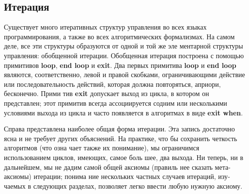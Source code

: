 \subsection{Итерация}
\noindent Существует много итеративных структур управления во всех языках 
программирования, а также во всех алгоритмических формализмах. 
На самом деле, все эти структуры образуются от одной и той же эле­
ментарной структуры управления: обобщенной итерации. Обобщенная 
итерация построена с помощью примитивов \textbf{loop},  \textbf{end loop} и \textbf{exit}. Два 
первых примитива \textbf{loop} и \textbf{end loop}  являются, соответственно, левой и 
правой скобками, ограничивающими действие или последовательность 
действий, которая должна повторяться, априори, бесконечно. Прими­
тив \textbf{exit} допускает выход из цикла, в котором он представлен; этот 
примитив  всегда  ассоциируется содним  или  несколькими  условиями 
выхода из цикла и часто появляется в алгоритмах в виде \textbf{exit when}.
Справа представлена наиболее общая форма 
итерации. Эта запись достаточно ясна и не 
требует других объяснений.  На практике, что­
бы сохранить четкость алгоритмов (что озна­
чает также их понимание), мы ограничимся              
использованием  циклов,  имеющих,  самое  боль­
шее,  два  выхода.  Ни  теперь,  ни  в  дальнейшем, 
мы  не  дадим  самой  общей  аксиомы  (правиль­
нее  сказать  мета-аксиомы)  итерации;  понима­
ние нескольких частных случаев итераций, изу­
чаемых в следующих разделах,  позволяет легко 
ввести  любую  нужную  аксиому.

